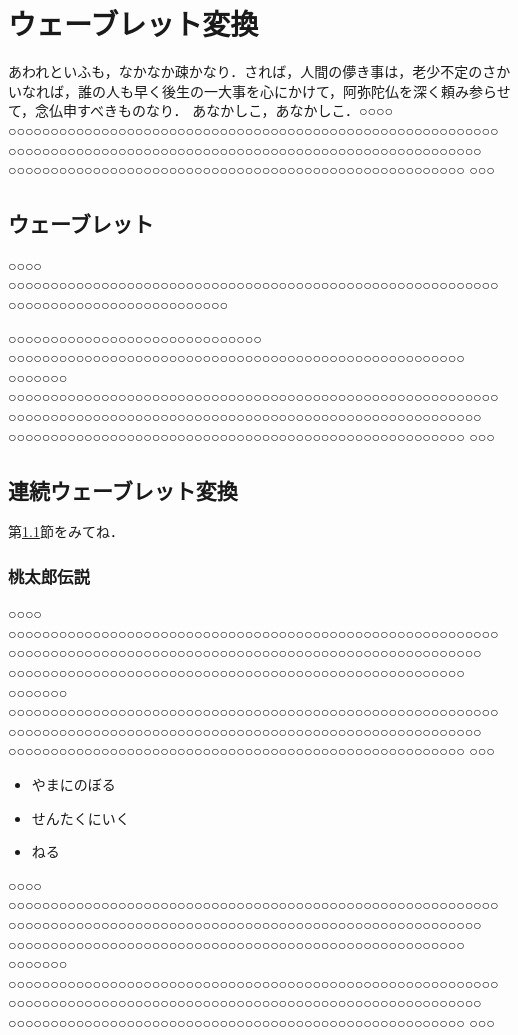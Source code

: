 
\chapter{ウェーブレット変換}
あわれといふも，なかなか疎かなり．されば，人間の儚き事は，老少不定のさかいなれば，誰の人も早く後生の一大事を心にかけて，阿弥陀仏を深く頼み参らせて，念仏申すべきものなり． あなかしこ，あなかしこ．○○○○ ○○○○○○○○○○○○○○○○○○○○○○○○○○○○○○○○○○○○○○○○○○○○○○○○○○○○○○○○○○ ○○○○○○○○○○○○○○○○○○○○○○○○○○○○○○○○○○○○○○○○○○○○○○○○○○○○○○○○ ○○○○○○○○○○○○○○○○○○○○○○○○○○○○○○○○○○○○○○○○○○○○○○○○○○○○○○ ○○○

\section{ウェーブレット}\label{AAAB}
○○○○ ○○○○○○○○○○○○○○○○○○○○○○○○○○○○○○○○○○○○○○○○○○○○○○○○○○○○○○○○○○ ○○○○○○○○○○○○○○○○○○○○○○○○○○

○○○○○○○○○○○○○○○○○○○○○○○○○○○○○○ ○○○○○○○○○○○○○○○○○○○○○○○○○○○○○○○○○○○○○○○○○○○○○○○○○○○○○○ ○○○○○○○ ○○○○○○○○○○○○○○○○○○○○○○○○○○○○○○○○○○○○○○○○○○○○○○○○○○○○○○○○○○ ○○○○○○○○○○○○○○○○○○○○○○○○○○○○○○○○○○○○○○○○○○○○○○○○○○○○○○○○ ○○○○○○○○○○○○○○○○○○○○○○○○○○○○○○○○○○○○○○○○○○○○○○○○○○○○○○ ○○○
\section{連続ウェーブレット変換}

第\ref{AAAB}節をみてね．

\subsection{桃太郎伝説}
○○○○ ○○○○○○○○○○○○○○○○○○○○○○○○○○○○○○○○○○○○○○○○○○○○○○○○○○○○○○○○○○ ○○○○○○○○○○○○○○○○○○○○○○○○○○○○○○○○○○○○○○○○○○○○○○○○○○○○○○○○ ○○○○○○○○○○○○○○○○○○○○○○○○○○○○○○○○○○○○○○○○○○○○○○○○○○○○○○ ○○○○○○○ ○○○○○○○○○○○○○○○○○○○○○○○○○○○○○○○○○○○○○○○○○○○○○○○○○○○○○○○○○○ ○○○○○○○○○○○○○○○○○○○○○○○○○○○○○○○○○○○○○○○○○○○○○○○○○○○○○○○○ ○○○○○○○○○○○○○○○○○○○○○○○○○○○○○○○○○○○○○○○○○○○○○○○○○○○○○○ ○○○

\begin{itemize}
\item やまにのぼる
\item せんたくにいく
\item ねる
\end{itemize}

○○○○ ○○○○○○○○○○○○○○○○○○○○○○○○○○○○○○○○○○○○○○○○○○○○○○○○○○○○○○○○○○ ○○○○○○○○○○○○○○○○○○○○○○○○○○○○○○○○○○○○○○○○○○○○○○○○○○○○○○○○ ○○○○○○○○○○○○○○○○○○○○○○○○○○○○○○○○○○○○○○○○○○○○○○○○○○○○○○ ○○○○○○○ ○○○○○○○○○○○○○○○○○○○○○○○○○○○○○○○○○○○○○○○○○○○○○○○○○○○○○○○○○○ ○○○○○○○○○○○○○○○○○○○○○○○○○○○○○○○○○○○○○○○○○○○○○○○○○○○○○○○○ ○○○○○○○○○○○○○○○○○○○○○○○○○○○○○○○○○○○○○○○○○○○○○○○○○○○○○○ ○○○

